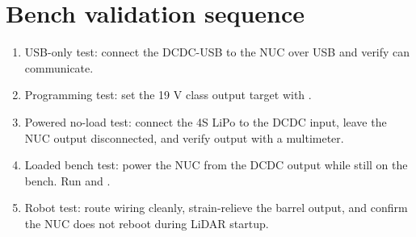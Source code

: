 \section{Bench validation sequence}
\begin{enumerate}
  \item USB-only test: connect the DCDC-USB to the NUC over USB and verify  can communicate.
  \item Programming test: set the 19 V class output target with .
  \item Powered no-load test: connect the 4S LiPo to the DCDC input, leave the NUC output disconnected, and verify output with a multimeter.
  \item Loaded bench test: power the NUC from the DCDC output while still on the bench.  Run  and .
  \item Robot test: route wiring cleanly, strain-relieve the barrel output, and confirm the NUC does not reboot during LiDAR startup.
\end{enumerate}
